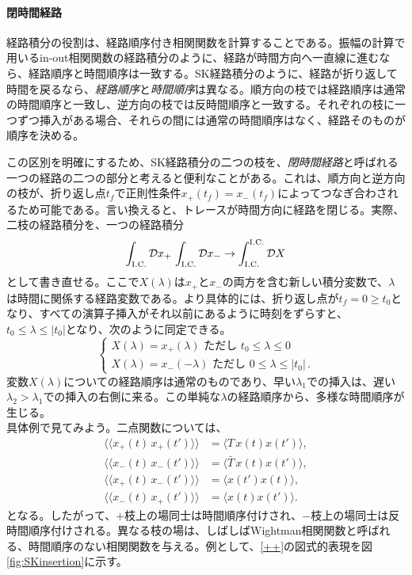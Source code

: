 \documentclass[a4paper,11pt,oneside]{article}
\theoremstyle{definition}
\numberwithin{equation}{section}
\begin{document}
\paragraph{閉時間経路} 経路積分の役割は、経路順序付き相関関数を計算することである。振幅の計算で用いるin-out相関関数の経路積分のように、経路が時間方向へ一直線に進むなら、経路順序と時間順序は一致する。SK経路積分のように、経路が折り返して時間を戻るなら、\textit{経路順序}と\textit{時間順序}は異なる。順方向の枝では経路順序は通常の時間順序と一致し、逆方向の枝では反時間順序と一致する。それぞれの枝に一つずつ挿入がある場合、それらの間には通常の時間順序はなく、経路そのものが順序を決める。



この区別を明確にするため、SK経路積分の二つの枝を、\textit{閉時間経路}と呼ばれる一つの経路の二つの部分と考えると便利なことがある。これは、順方向と逆方向の枝が、折り返し点$ t_{f}$で正則性条件$ x_{+}(t_{f})=x_{-}(t_{f})$によってつなぎ合わされるため可能である。言い換えると、トレースが時間方向に経路を閉じる。実際、二枝の経路積分を、一つの経路積分
\begin{align}
\int_{\rm I.C.}\mathcal D x_+\,
\int_{\rm I.C.}\mathcal D x_- \to \int_{\rm I.C.}^{\rm I.C.}\mathcal{D}X
\end{align}
として書き直せる。ここで$ X(\lambda)$は$ x_{+}$と$ x_{-}$の両方を含む新しい積分変数で、$  \lambda$は時間に関係する経路変数である。より具体的には、折り返し点が$ t_{f}=0\geq t_{0}$となり、すべての演算子挿入がそれ以前にあるように時刻をずらすと、$ t_{0}\leq \lambda \leq |t_{0}|$となり、次のように同定できる。
\begin{equation}
\begin{cases}
X(\lambda)=x_{+}(\lambda) \text{ ただし } t_{0}\leq \lambda \leq 0  \\
X(\lambda)=x_{-}(-\lambda) \text{ ただし } 0 \leq \lambda \leq |t_{0}| \,.
\end{cases}
\end{equation}
変数$ X(\lambda)$についての経路順序は通常のものであり、早い$ \lambda_{1}$での挿入は、遅い$ \lambda_{2}> \lambda_{1}$での挿入の右側に来る。この単純な$ \lambda$の経路順序から、多様な時間順序が生じる。\\





具体例で見てみよう。二点関数については、
\begin{align}\label{++}
\langle\!\langle x_+(t)\,x_+(t')\rangle\!\rangle
&=
\langle T\,x(t)x(t')\rangle ,
\\
\langle\!\langle x_-(t)\,x_-(t')\rangle\!\rangle
&=
\langle \bar T\,x(t)x(t')\rangle ,
\\
\langle\!\langle x_+(t)\,x_-(t')\rangle\!\rangle
&=
\langle x(t')x(t)\rangle ,
\\
\langle\!\langle x_-(t)\,x_+(t')\rangle\!\rangle
&=
\langle x(t)x(t')\rangle .
\end{align}
となる。したがって、$+$枝上の場同士は時間順序付けされ、$-$枝上の場同士は反時間順序付けされる。異なる枝の場は、しばしばWightman相関関数と呼ばれる、時間順序のない相関関数を与える。例として、\eqref{++}の図式的表現を図\ref{fig:SKinsertion}に示す。
\end{document}

